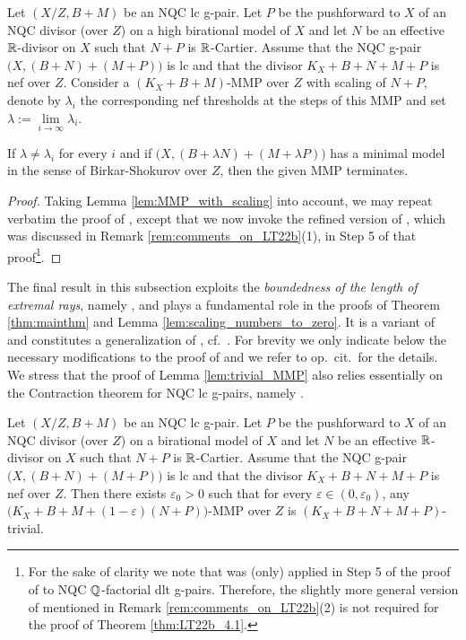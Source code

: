 	\begin{thm}\label{thm:LT22b_4.1}
		Let $ (X/Z,B+M) $ be an NQC lc g-pair. Let $ P $ be the pushforward to $X$ of an NQC divisor (over $ Z $) on a high birational model of $ X $ and let $ N $ be an effective $ \mathbb{R} $-divisor on $ X $ such that $ N+P $ is $ \mathbb{R} $-Cartier. Assume that the NQC g-pair $ \big( X, (B+N) + (M+P) \big) $ is lc and that the divisor $ K_X + B + N + M + P $ is nef over $ Z $. Consider a $ (K_X + B + M) $-MMP over $Z$ with scaling of $ N+P $, denote by $ \lambda_i $ the corresponding nef thresholds at the steps of this MMP and set $ \lambda := \lim\limits_{i\to \infty} \lambda_i $.
		
		If $ \lambda \neq \lambda_i $ for every $ i $ and if $\big(X,(B+\lambda N)+(M+\lambda P)\big)$ has a minimal model in the sense of Birkar-Shokurov over $Z$, then the given MMP terminates.
	\end{thm}
	
	\begin{proof}
		Taking Lemma \ref{lem:MMP_with_scaling} into account, we may repeat verbatim the proof of \cite[Theorem 4.1]{LT22b}, except that we now invoke the refined version of \cite[Theorem 2.14]{LT22b}, which was discussed in Remark \ref{rem:comments_on_LT22b}(1), in Step 5 of that proof\footnote{For the sake of clarity we note that \cite[Lemma 2.16]{LT22b} was (only) applied in Step 5 of the proof of \cite[Theorem 4.1]{LT22b} to NQC $ \mathbb{Q} $-factorial dlt g-pairs. Therefore, the slightly more general version of \cite[Lemma 2.16]{LT22b} mentioned in Remark \ref{rem:comments_on_LT22b}(2) is not required for the proof of Theorem \ref{thm:LT22b_4.1}.}.
	\end{proof}
	
	The final result in this subsection exploits the \emph{boundedness of the length of extremal rays}, namely \cite[Theorem 1.3(2)]{HaconLiu21}, and plays a fundamental role in the proofs of Theorem \ref{thm:mainthm} and Lemma \ref{lem:scaling_numbers_to_zero}. It is a variant of \cite[Lemma 3.21]{HanLi22} and constitutes a generalization of \cite[Lemma 2.20]{LT22a}, cf.\ \cite[Proposition 2.12]{LT22b}. For brevity we only indicate below the necessary modifications to the proof of \cite[Lemma 2.20]{LT22a} and we refer to op.\ cit.\ for the details. We stress that the proof of Lemma \ref{lem:trivial_MMP} also relies essentially on the Contraction theorem for NQC lc g-pairs, namely \cite[Theorem 1.5]{Xie22}.
	
	\begin{lem}\label{lem:trivial_MMP}
		Let $ (X/Z,B+M) $ be an NQC lc g-pair. Let $ P $ be the pushforward to $ X $ of an NQC divisor (over $ Z $) on a birational model of $ X $ and let $ N $ be an effective $ \mathbb{R} $-divisor on $ X $ such that $ N+P $ is $ \mathbb{R} $-Cartier. Assume that the NQC g-pair $ \big( X, (B+N) + (M+P) \big) $ is lc and that the divisor $ K_X + B + N + M + P $ is nef over $ Z $. Then there exists $ \varepsilon_0 >0 $ such that for every $ \varepsilon \in (0,\varepsilon_0)$, any $ \big(K_X + B + M + (1-\varepsilon)(N+P) \big) $-MMP over $Z$ is $ (K_X + B + N + M + P) $-trivial.
	\end{lem}
	
